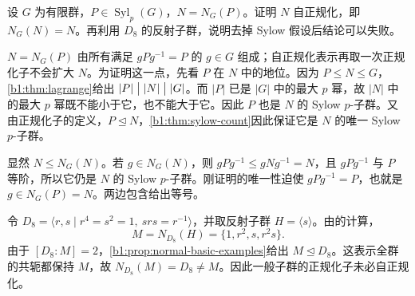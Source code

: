 \begin{exercise}\label{b1:ex:05-8}
	设 \(G\) 为有限群，\(P\in\operatorname{Syl}_p(G)\)，\(N=N_G(P)\)。证明 \(N\) 自正规化，即 \(N_G(N)=N\)。再利用 \(D_8\) 的反射子群，说明去掉 Sylow 假设后结论可以失败。
\end{exercise}
\begin{solution}
	\(N=N_G(P)\) 由所有满足 \(gPg^{-1}=P\) 的 \(g\in G\) 组成；自正规化表示再取一次正规化子不会扩大 \(N\)。为证明这一点，先看 \(P\) 在 \(N\) 中的地位。因为 \(P\leq N\leq G\)，\cref{b1:thm:lagrange}给出 \(|P|\bigm\vert|N|\bigm\vert|G|\)。而 \(|P|\) 已是 \(|G|\) 中的最大 \(p\) 幂，故 \(|N|\) 中的最大 \(p\) 幂既不能小于它，也不能大于它。因此 \(P\) 也是 \(N\) 的 Sylow \(p\)-子群。又由正规化子的定义，\(P\trianglelefteq N\)，\cref{b1:thm:sylow-count}因此保证它是 \(N\) 的唯一 Sylow \(p\)-子群。

	显然 \(N\leq N_G(N)\)。若 \(g\in N_G(N)\)，则 \(gPg^{-1}\leq gNg^{-1}=N\)，且 \(gPg^{-1}\) 与 \(P\) 等阶，所以它仍是 \(N\) 的 Sylow \(p\)-子群。刚证明的唯一性迫使 \(gPg^{-1}=P\)，也就是 \(g\in N_G(P)=N\)。两边包含给出等号。

	令 \(D_8=\langle r,s\mid r^4=s^2=1,\ srs=r^{-1}\rangle\)，并取反射子群 \(H=\langle s\rangle\)。由的计算，
	\[
		M=N_{D_8}(H)=\{1,r^2,s,r^2s\}.
	\]
	由于 \([D_8:M]=2\)，\cref{b1:prop:normal-basic-examples}给出 \(M\trianglelefteq D_8\)。这表示全群的共轭都保持 \(M\)，故 \(N_{D_8}(M)=D_8\ne M\)。因此一般子群的正规化子未必自正规化。
\end{solution}

